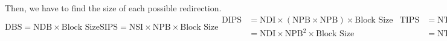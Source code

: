 Then, we have to find the size of each possible redirection.
\begin{subequations}\label{eq:Indirect_Pointer_Sizes}
  \begin{equation}\label{subeq:Direct_Pointer_Size}
    \mathrm{DBS} = \mathrm{NDB} \times \text{Block Size}
  \end{equation}
  \begin{equation}\label{subeq:Single_Indirect_Pointer_Size}
    \mathrm{SIPS} = \mathrm{NSI} \times \mathrm{NPB} \times \text{Block Size}
  \end{equation}
  \begin{equation}\label{subeq:Double_Indirect_Pointer_Size}
    \begin{aligned}
      \mathrm{DIPS} &= \mathrm{NDI} \times (\mathrm{NPB} \times \mathrm{NPB}) \times \text{Block Size} \\
      &= \mathrm{NDI} \times {\mathrm{NPB}}^{2} \times \text{Block Size} \\
    \end{aligned}
  \end{equation}
  \begin{equation}\label{subeq:Triple_Indirect_Pointer_Size}
    \begin{aligned}
      \mathrm{TIPS} &= \mathrm{NTI} \times (\mathrm{NPB} \times \mathrm{NPB} \times \mathrm{NPB}) \times \text{Block Size} \\
      &= \mathrm{NTI} \times {\mathrm{NPB}}^{3} \times \text{Block Size} \\
    \end{aligned}
  \end{equation}
\end{subequations}

